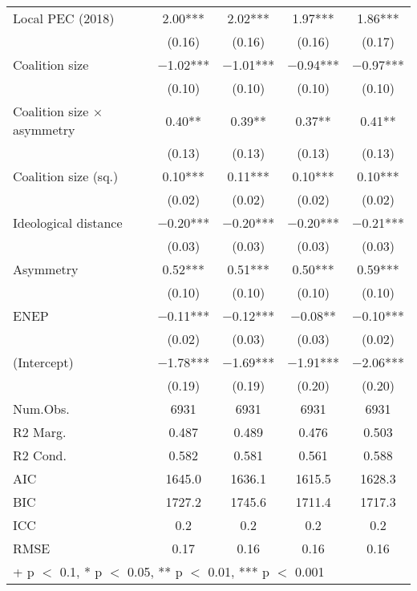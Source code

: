 \begin{longtable}{lcccc}
Local PEC (2018) & \num{2.00}*** & \num{2.02}*** & \num{1.97}*** & \num{1.86}***\\
 & (\num{0.16}) & (\num{0.16}) & (\num{0.16}) & (\num{0.17})\\
Coalition size & \num{-1.02}*** & \num{-1.01}*** & \num{-0.94}*** & \num{-0.97}***\\
 & (\num{0.10}) & (\num{0.10}) & (\num{0.10}) & \vphantom{1} (\num{0.10})\\
Coalition size $\times$ asymmetry & \num{0.40}** & \num{0.39}** & \num{0.37}** & \num{0.41}**\\
 & (\num{0.13}) & (\num{0.13}) & (\num{0.13}) & (\num{0.13})\\
Coalition size (sq.) & \num{0.10}*** & \num{0.11}*** & \num{0.10}*** & \num{0.10}***\\
 & (\num{0.02}) & (\num{0.02}) & (\num{0.02}) & (\num{0.02})\\
Ideological distance & \num{-0.20}*** & \num{-0.20}*** & \num{-0.20}*** & \num{-0.21}***\\
 & (\num{0.03}) & (\num{0.03}) & (\num{0.03}) & (\num{0.03})\\
Asymmetry & \num{0.52}*** & \num{0.51}*** & \num{0.50}*** & \num{0.59}***\\
 & (\num{0.10}) & (\num{0.10}) & (\num{0.10}) & (\num{0.10})\\
ENEP & \num{-0.11}*** & \num{-0.12}*** & \num{-0.08}** & \num{-0.10}***\\
 & (\num{0.02}) & (\num{0.03}) & (\num{0.03}) & (\num{0.02})\\
(Intercept) & \num{-1.78}*** & \num{-1.69}*** & \num{-1.91}*** & \num{-2.06}***\\
 & (\num{0.19}) & (\num{0.19}) & (\num{0.20}) & (\num{0.20})\\
\midrule
Num.Obs. & \num{6931} & \num{6931} & \num{6931} & \num{6931}\\
R2 Marg. & \num{0.487} & \num{0.489} & \num{0.476} & \num{0.503}\\
R2 Cond. & \num{0.582} & \num{0.581} & \num{0.561} & \num{0.588}\\
AIC & \num{1645.0} & \num{1636.1} & \num{1615.5} & \num{1628.3}\\
BIC & \num{1727.2} & \num{1745.6} & \num{1711.4} & \num{1717.3}\\
ICC & \num{0.2} & \num{0.2} & \num{0.2} & \num{0.2}\\
RMSE & \num{0.17} & \num{0.16} & \num{0.16} & \num{0.16}\\
\bottomrule
\multicolumn{5}{l}{\rule{0pt}{1em}+ p $<$ 0.1, * p $<$ 0.05, ** p $<$ 0.01, *** p $<$ 0.001}\\
\end{longtable}
